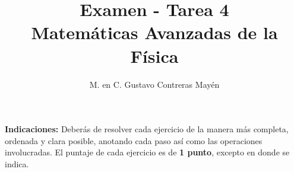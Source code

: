 
\usepackage{apacite}
\title{Examen - Tarea 4 \\[0.3em]  \large{Matemáticas Avanzadas de la Física}\vspace{-3ex}}
\author{M. en C. Gustavo Contreras Mayén}
\date{ }

\vspace{-4cm}
\maketitle
\fontsize{14}{14}\selectfont

\textbf{Indicaciones: } Deberás de resolver cada ejercicio de la manera más completa, ordenada y clara posible, anotando cada paso así como las operaciones involucradas. El puntaje de cada ejercicio es de \textbf{1 punto}, excepto en donde se indica.

